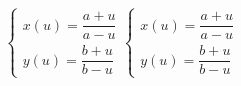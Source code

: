 \documentclass{book}
\begin{document}
\begin{equation*}
\begin{cases}
x(u)=\dfrac{a+u}{a-u}\\
y(u)=\dfrac{b+u}{b-u}
\end{cases}
\begin{cases}
x(u)=\dfrac{a+u}{a-u}\\[15pt]
y(u)=\dfrac{b+u}{b-u}
\end{cases}
\end{equation*}
\end{document}
